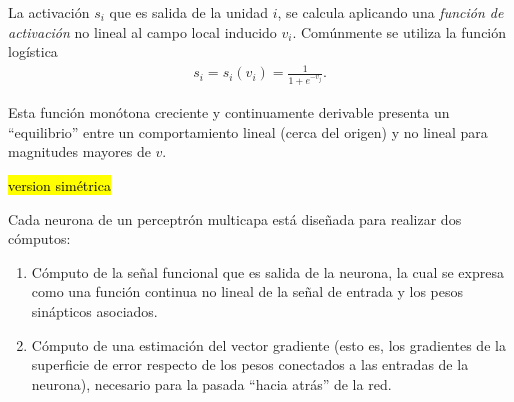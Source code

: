 \documentclass[12pt,bibliography=oldstyle,DIV=12,parskip=half-]{scrreprt}
\newcommand{\e}{\emph}
\begin{document}
La activación $s_i$ que es salida de la unidad $i$, se calcula
aplicando una \e{función de activación} no lineal al campo local
inducido $v_i$. Comúnmente se utiliza la función logística
%
\begin{align*}
  s_i=s_i(v_i)=\frac{1}{1+e^{-v_j}}.
\end{align*}
%


%
Esta función monótona creciente y continuamente derivable presenta
un ``equilibrio'' entre un comportamiento lineal (cerca del origen)
y no lineal para magnitudes mayores de $v$.

\hl{version simétrica}

Cada neurona de un perceptrón multicapa está diseñada para realizar
dos cómputos:
%
\begin{enumerate}
\item Cómputo de la señal funcional que es salida de la neurona, la
  cual se expresa como una función continua no lineal de la señal de
  entrada y los pesos sinápticos asociados.
\item Cómputo de una estimación del vector gradiente (esto es, los
  gradientes de la superficie de error respecto de los pesos
  conectados a las entradas de la neurona), necesario para la pasada
  ``hacia atrás'' de la red.
\end{enumerate}



\end{document}
